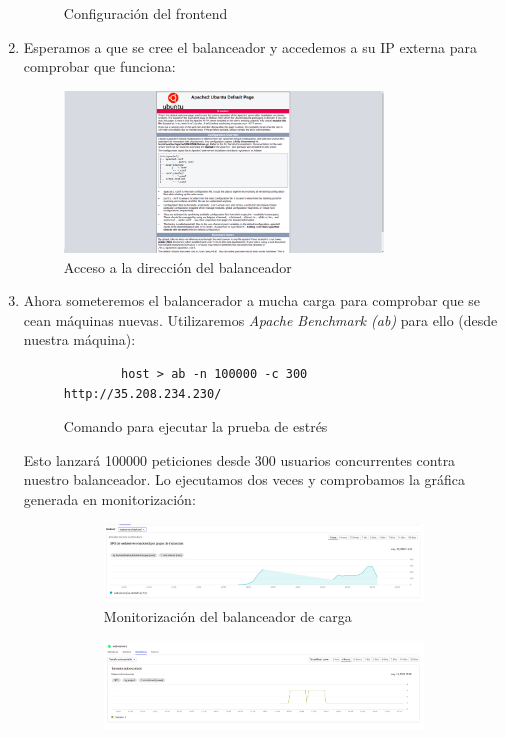 \documentclass[12pt,spanish]{article}
\begin{document}
\begin{enumerate}
\begin{figure}[H]
		\caption{Configuración del frontend}
	\end{figure}
	\item Esperamos a que se cree el balanceador y accedemos a su IP externa para comprobar que funciona:
	\begin{figure}[H]
		\centering
		\includegraphics[width=0.8\textwidth]{project/load_balancer_ok.png}
		\caption{Acceso a la dirección del balanceador}
	\end{figure}
	\newpage
	\item Ahora someteremos el balancerador a mucha carga para comprobar que se cean máquinas nuevas. Utilizaremos \emph{Apache Benchmark (ab)} para ello (desde nuestra máquina):
	\begin{figure}[H]
		\centering
		\begin{lstlisting}
		host > ab -n 100000 -c 300 http://35.208.234.230/
		\end{lstlisting}
	\caption{Comando para ejecutar la prueba de estrés}
\end{figure}
	Esto lanzará 100000 peticiones desde 300 usuarios concurrentes contra nuestro balanceador. Lo ejecutamos dos veces y comprobamos la gráfica generada en monitorización:
	\begin{figure}[H]
		\centering
	  \begin{subfigure}[t]{0.8\textwidth}
			\includegraphics[width=\textwidth]{project/monitoring.png}
			\caption{Monitorización del balanceador de carga}
	  \end{subfigure}
	  \begin{subfigure}[t]{0.8\textwidth}
			\includegraphics[width=\textwidth]{project/monitoring_groups.png}

\end{subfigure}
\end{figure}
\end{enumerate}
\end{document}
